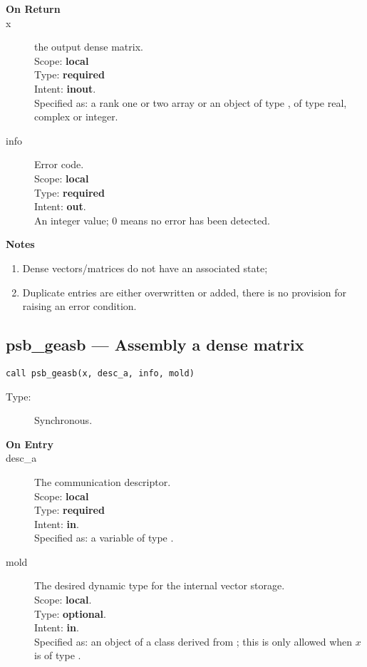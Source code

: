 \begin{description}
\item[\bf On Return]
\item[x] the output dense matrix.\\
Scope: {\bf local} \\
Type: {\bf required}\\
Intent: {\bf inout}.\\
Specified as:  a rank one or two array or an object of type \vdata, of
type real, complex or integer.\\ 
\item[info] Error code.\\
Scope: {\bf local} \\
Type: {\bf required} \\
Intent: {\bf out}.\\
An integer value; 0 means no error has been detected. 
\end{description}

{\par\noindent\large\bfseries Notes}
\begin{enumerate}
\item Dense vectors/matrices do not have an associated state;
\item Duplicate entries are either overwritten or added, there is no
  provision for raising an error condition. 
\end{enumerate}


%
%
\clearpage\subsection{psb\_geasb --- Assembly a dense matrix}

\begin{verbatim}
call psb_geasb(x, desc_a, info, mold)
\end{verbatim}

\begin{description}
\item[Type:] Synchronous.
\item[\bf On Entry]
\item[desc\_a] The communication descriptor.\\
Scope: {\bf local} \\
Type: {\bf required}\\
Intent: {\bf in}.\\
Specified as: a variable of type \descdata.\\
\item[mold] The desired dynamic type for the internal vector storage.\\
Scope: {\bf local}.\\
Type: {\bf optional}.\\
Intent: {\bf in}.\\
Specified as: an object of a class derived from \vbasedata; this is
only allowed when $x$ is of type \vdata.
\end{description}

